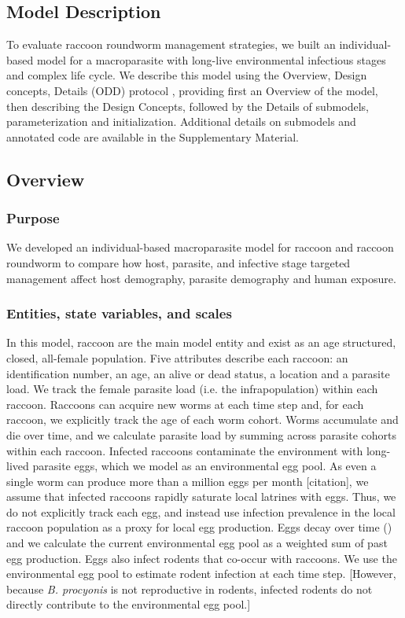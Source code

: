 \documentclass[11pt]{article}
\begin{document}
\subsection{Model Description}

To evaluate raccoon roundworm management strategies, we built an
individual-based model for a macroparasite with long-live
environmental infectious stages and complex life cycle. We describe this
model using the Overview, Design concepts, Details (ODD) protocol \citep{Grimm2006,Grimm2010}, providing first an Overview of the model, then
describing the Design Concepts, followed by the Details of submodels,
parameterization and initialization. Additional details on submodels and
annotated code are available in the Supplementary Material.

\subsection{Overview}

\subsubsection{Purpose}

We developed an individual-based macroparasite model for raccoon and
raccoon roundworm to compare how host, parasite, and infective stage
targeted management affect host demography, parasite demography and
human exposure.

\subsubsection{Entities, state variables, and scales}

In this model, raccoon are the main model entity and exist as an age
structured, closed, all-female population. Five attributes describe each raccoon: an identification number, an age, an alive
or dead status, a location and a parasite load. We track the female parasite
load (i.e. the infrapopulation) within each raccoon. Raccoons can acquire new
worms at each time step and, for each raccoon, we explicitly track the age of each
worm cohort. Worms accumulate and die over time, and we
calculate parasite load by summing across parasite cohorts within each raccoon.
Infected raccoons contaminate the environment with long-lived parasite
eggs, which we model as an environmental egg pool. As even a single worm
can produce more than a million eggs per month [citation], we assume that infected
raccoons rapidly saturate local latrines with eggs. Thus, we do not
explicitly track each egg, and instead use infection prevalence in the
local raccoon population as a proxy for local egg production. Eggs decay
over time () and we calculate the current environmental egg pool as a
weighted sum of past egg production. Eggs also infect rodents that co-occur with raccoons. We use the
environmental egg pool to estimate rodent infection at each time step. [However, because \emph{B. procyonis} is not reproductive in rodents, infected rodents do not directly contribute to the environmental egg pool.]
\end{document}
